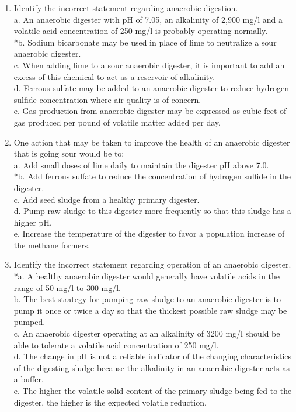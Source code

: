 \documentclass{article}
\begin{document}
\begin{enumerate}
\item  Identify the incorrect statement regarding anaerobic digestion. \\

a. An anaerobic digester with pH of 7.05, an alkalinity of 2,900 mg/l and a volatile acid concentration of 250 mg/l is probably operating normally. \\
*b. Sodium bicarbonate may be used in place of lime to neutralize a sour anaerobic digester. \\
c. When adding lime to a sour anaerobic digester, it is important to add an excess of this chemical to act as a reservoir of alkalinity. \\
d. Ferrous sulfate may be added to an anaerobic digester to reduce hydrogen sulfide concentration where air quality is of concern. \\
e. Gas production from anaerobic digester may be expressed as cubic feet of gas produced per pound of volatile matter added per day. \\

\item  One action that may be taken to improve the health of an anaerobic digester that is going sour would be to: \\

a. Add small doses of lime daily to maintain the digester pH above 7.0. \\
*b. Add ferrous sulfate to reduce the concentration of hydrogen sulfide in the digester. \\
c. Add seed sludge from a healthy primary digester. \\
d. Pump raw sludge to this digester more frequently so that this sludge has a higher pH. \\
e. Increase the temperature of the digester to favor a population increase of the methane formers. \\

\item  Identify the incorrect statement regarding operation of an anaerobic digester. \\

*a. A healthy anaerobic digester would generally have volatile acids in the range of 50 mg/l to 300 mg/l. \\
b. The best strategy for pumping raw sludge to an anaerobic digester is to pump it once or twice a day so that the thickest possible raw sludge may be pumped. \\
c. An anaerobic digester operating at an alkalinity of 3200 mg/l should be able to tolerate a volatile acid concentration of 250 mg/l. \\
d. The change in pH is not a reliable indicator of the changing characteristics of the digesting sludge because the alkalinity in an anaerobic digester acts as a buffer. \\
e. The higher the volatile solid content of the primary sludge being fed to the digester, the higher is the expected volatile reduction. \\


\end{enumerate}
\end{document}
